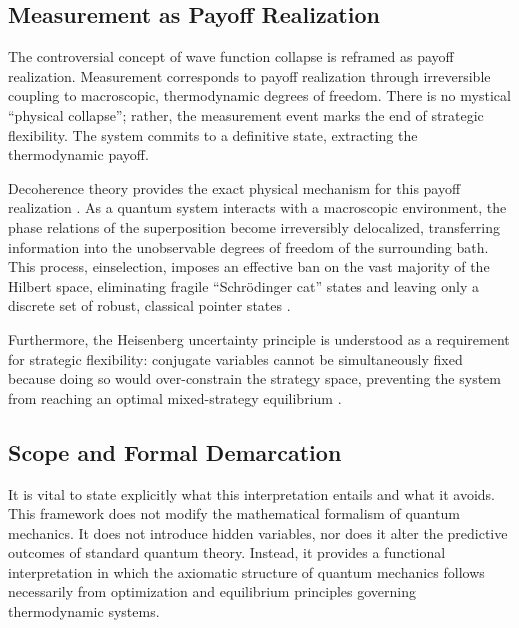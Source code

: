\documentclass[12pt,a4paper]{article}
\theoremstyle{remark}
\begin{document}
\subsection{Measurement as Payoff Realization}

The controversial concept of wave function collapse is reframed as payoff realization. Measurement corresponds to payoff realization through irreversible coupling to macroscopic, thermodynamic degrees of freedom. There is no mystical ``physical collapse''; rather, the measurement event marks the end of strategic flexibility. The system commits to a definitive state, extracting the thermodynamic payoff.

Decoherence theory provides the exact physical mechanism for this payoff realization \citep{MeasurementClassical}. As a quantum system interacts with a macroscopic environment, the phase relations of the superposition become irreversibly delocalized, transferring information into the unobservable degrees of freedom of the surrounding bath. This process, einselection, imposes an effective ban on the vast majority of the Hilbert space, eliminating fragile ``Schr\"odinger cat'' states and leaving only a discrete set of robust, classical pointer states \citep{Zurek2003}.

Furthermore, the Heisenberg uncertainty principle is understood as a requirement for strategic flexibility: conjugate variables cannot be simultaneously fixed because doing so would over-constrain the strategy space, preventing the system from reaching an optimal mixed-strategy equilibrium \citep{HeisenbergCovariant}.

\subsection{Scope and Formal Demarcation}

It is vital to state explicitly what this interpretation entails and what it avoids. This framework does not modify the mathematical formalism of quantum mechanics. It does not introduce hidden variables, nor does it alter the predictive outcomes of standard quantum theory. Instead, it provides a functional interpretation in which the axiomatic structure of quantum mechanics follows necessarily from optimization and equilibrium principles governing thermodynamic systems.
\end{document}
